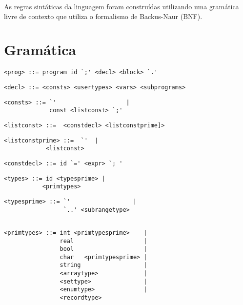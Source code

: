 As regras sintáticas da linguagem foram construídas utilizando uma gramática livre de contexto que utiliza o formalismo de Backus-Naur (BNF).

\section{Gramática}

\begin{footnotesize}
\begin{lstlisting}[frame=single, label={prog}, language=pie]
<prog> ::= program id `;' <decl> <block> `.'
\end{lstlisting}

\begin{lstlisting}[frame=single, label={decl}, language=pie]
<decl> ::= <consts> <usertypes> <vars> <subprograms>
\end{lstlisting}

\begin{lstlisting}[frame=single, label={consts}, language=pie]
<consts> ::= `'                    | 
             const <listconst> `;'
\end{lstlisting}

\begin{lstlisting}[frame=single, label={listconst}, language=pie]
<listconst> ::=  <constdecl> <listconstprime]>
\end{lstlisting}

\begin{lstlisting}[frame=single, label={listconstprime}, language=pie]
<listconstprime> ::=  `'  | 
		    <listconst>
\end{lstlisting}

\begin{lstlisting}[frame=single, label={constdecl}, language=pie]
<constdecl> ::= id `=' <expr> `; '
\end{lstlisting}

\begin{lstlisting}[frame=single, label={types}, language=pie]
<types> ::= id <typesprime> |
           <primtypes>
\end{lstlisting}

\begin{lstlisting}[frame=single, label={typesprime}, language=pie]
<typesprime> ::= `'                  |
                 `..' <subrangetype>
           
\end{lstlisting}

\begin{lstlisting}[frame=single, label={primtypes}, language=pie]
<primtypes> ::= int <primtypesprime>    |
                real                    | 
                bool                    |
                char   <primtypesprime> |
                string                  |
                <arraytype>             |
                <settype>               |
                <enumtype>              |
                <recordtype>
\end{lstlisting}


\end{footnotesize}
